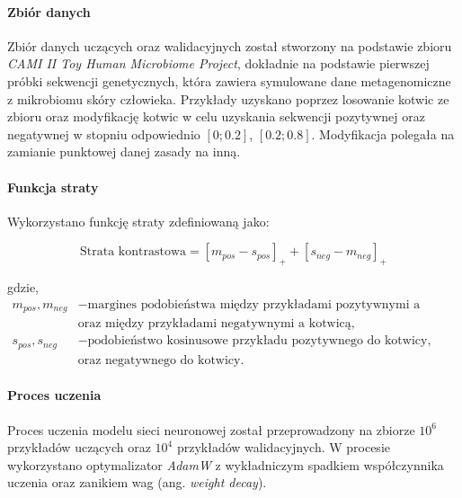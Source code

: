             \paragraph{Zbiór danych}
                Zbiór danych uczących oraz walidacyjnych został stworzony na podstawie zbioru \textit{CAMI II Toy Human Microbiome Project}\cite{Fritz2019}, dokładnie na podstawie pierwszej próbki sekwencji genetycznych, która zawiera symulowane dane metagenomiczne z mikrobiomu skóry człowieka. Przykłady uzyskano poprzez losowanie kotwic ze zbioru oraz modyfikację kotwic w celu uzyskania sekwencji pozytywnej oraz negatywnej w stopniu odpowiednio $[0; 0.2]$, $[0.2; 0.8]$. Modyfikacja polegała na zamianie punktowej danej zasady na inną.

            \paragraph{Funkcja straty}
                Wykorzystano funkcję straty zdefiniowaną jako:

                \begin{equation}
                    \text{Strata kontrastowa} = [m_{pos} - s_{pos}]_{+} + [s_{neg} - m_{neg}]_{+}
                \end{equation}

                gdzie,
                \begin{align*}
                    m_{pos}, m_{neg} &- \text{margines podobieństwa między przykładami pozytywnymi a kotwicą,} \\
                    &\text{oraz między przykładami negatywnymi a kotwicą}, \\
                    s_{pos}, s_{neg} &- \text{podobieństwo kosinusowe przykładu pozytywnego do kotwicy,} \\
                    &\text{oraz negatywnego do kotwicy.}
                \end{align*}

            \paragraph{Proces uczenia}
                Proces uczenia modelu sieci neuronowej został przeprowadzony na zbiorze $10^{6}$ przykładów uczących oraz $10^{4}$ przykładów walidacyjnych. 
                W procesie wykorzystano optymalizator \textit{AdamW}\cite{Loshchilov2017DecoupledWD} z wykładniczym spadkiem współczynnika uczenia oraz zanikiem wag (ang. \textit{weight decay}).
            
